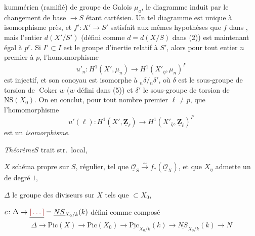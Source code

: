 \documentclass[11pt,a4paper]{article}
\begin{document}
kummérien  (ramifié) de  groupe de Galois
$\mu_a$, le diagramme induit par le changement de base
\uncertain{$\eta$} $\to S$ étant cartésien. Un tel diagramme est unique à
isomorphisme près, et $f' \colon X' \to S'$ satisfait aux mêmes hypothèses que
$f$ dans \quad , mais l'entier $d(X'/S')$ (défini comme $d = d(X/S)$ dans (2))
est maintenant égal à $p^r$. Si $I' \subset I$ est le groupe d'inertie relatif
à $S'$, alors pour tout entier $n$ premier à $p$, l'homomorphisme
\[
u'_n \colon H^1(X', \mu_n) \longrightarrow H^1(X'_{\bar\eta}, \mu_n)^{I'}
\]
est injectif, et son conoyau est isomorphe à ${}_n\delta/{}_n\delta'$, où
$\delta$ est le sous-groupe de torsion de $\operatorname{Coker} w$ ($w$ défini
dans (5)) et $\delta'$ le sous-groupe de torsion de $\mathrm{NS}(X_0)$. On en conclut,
pour tout nombre premier $\ell \neq p$, que l'homomorphisme
\[
u'(\ell) \colon H^1(X', \underline{\mathbf{Z}}_\ell) \longrightarrow
H^1(X'_{\bar\eta}, \underline{\mathbf{Z}}_\ell)^{I'}
\]
est un \emph{isomorphisme}.


\emph{Théorème}\quad $S$ trait str.\ local,

$X$ schéma propre sur $S$, régulier, tel que $\underline{\mathcal{O}}_S
\xrightarrow{\sim} f_*(\underline{\mathcal{O}}_X)$, et que $X_\eta$ admette un
 de degré $1$,

$\Delta$ le groupe des diviseurs sur $X$ tels que 
$\subset X_0$,

$c \colon \Delta \to \struck{\ill{}} = \underline{NS}_{X_0/k}(k)$ défini comme
composé
\[
\Delta \to \mathrm{Pic}(X) \to \mathrm{Pic}(X_0) \to
\underline{\mathrm{Pic}}_{X_0/k}(k) \to \underline{NS}_{X_0/k}(k) \to N
\]
\end{document}
